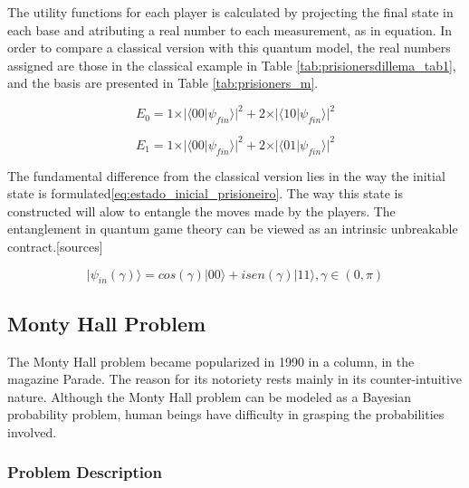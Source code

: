 The utility functions for each player is calculated by projecting the final state in each base and atributing a real number to each measurement, as in equation.
In order to compare a classical version with this quantum model, the real numbers assigned are those in the classical example in Table \ref{tab:prisionersdillema_tab1}, and the basis are presented in Table \ref{tab:prisioners_m}.

\begin{equation}
E_{0}=1\times\vert\langle00\vert\psi_{fin}\rangle\vert^{2}+2\times\vert\langle10\vert\psi_{fin}\rangle\vert^{2}
\end{equation}


\begin{equation}
E_{1}=1\times\vert\langle00\vert\psi_{fin}\rangle\vert^{2}+2\times\vert\langle01\vert\psi_{fin}\rangle\vert^{2}
\end{equation}

The fundamental difference from the classical version lies in the way the initial state is formulated\ref{eq:estado_inicial_prisioneiro}. The way this state is constructed will alow to entangle the moves made by the players. The entanglement in quantum game theory can be viewed as an intrinsic unbreakable contract.[sources]

\begin{equation}
\label{eq:estado_inicial_prisioneiro}
\vert \psi_{in}(\gamma) \rangle= cos( \gamma)\vert 00\rangle+ isen(\gamma)\vert 11 \rangle, \gamma \in (0,\pi)
\end{equation}




\subsection{Monty Hall Problem}
\label{subsec:monty_hall}

The Monty Hall problem became popularized in 1990 in a column, in the magazine Parade\cite{Savant1990}. The reason for its notoriety rests mainly in its counter-intuitive nature. Although the Monty Hall problem can be modeled as a Bayesian probability problem, human beings have difficulty in grasping the probabilities involved.

\subsubsection{Problem Description}
\label{subsubsec:monty_hall_problem description}


